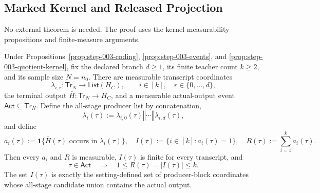 \subsection{Marked Kernel and Released Projection}\label{app:step_004}


No external theorem is needed. The proof uses the kernel-measurability
propositions and finite-measure arguments.

 \begin{lemma}\label{lem:step-004-occurrence}
Under  Propositions~\ref{prop:step-003-coding},
\ref{prop:step-003-events}, and
\ref{prop:step-003-quotient-kernel}, fix the declared branch \(d\geq1\),
its finite teacher count \(k\geq2\), and its sample size \(N=n_0\). There
are measurable transcript coordinates
\[
\lambda_{i,r}:\mathsf{Tr}_N\longrightarrow
\mathsf{List}(H_C),
\qquad i\in[k],\quad r\in\{0,\ldots,d\},
\tag{2}
\]
the terminal output \(\bar H:\mathsf{Tr}_N\to H_C\), and a measurable
actual-output event \(\mathsf{Act}\subseteq\mathsf{Tr}_N\). Define the
all-stage producer list by concatenation,
\[
\lambda_i(\tau)
:=\lambda_{i,0}(\tau)\mathbin{\Vert}\cdots
  \mathbin{\Vert}\lambda_{i,d}(\tau),
\tag{3}
\]
and define
\[
a_i(\tau):=
\mathbf1\{\bar H(\tau)\text{ occurs in }\lambda_i(\tau)\},
\quad
I(\tau):=\{i\in[k]:a_i(\tau)=1\},
\quad
R(\tau):=\sum_{i=1}^k a_i(\tau).
\tag{4}
\]
Then every \(a_i\) and \(R\) is measurable, \(I(\tau)\) is finite for
every transcript, and
\[
\tau\in\mathsf{Act}\quad\Longrightarrow\quad
1\leq R(\tau)=|I(\tau)|\leq k.
\tag{5}
\]
The set \(I(\tau)\) is exactly the setting-defined set of producer-block
coordinates whose all-stage candidate union contains the actual output.


\end{lemma}


